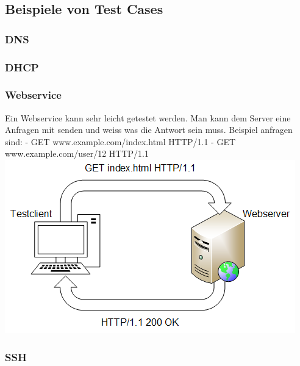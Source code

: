 \documentclass[a4,12pt]{scrartcl}
\begin{document}
\subsection{Beispiele von Test Cases}
\subsubsection{DNS}

\subsubsection{DHCP}

\subsubsection{Webservice}
Ein Webservice kann sehr leicht getestet werden. Man kann dem Server eine Anfragen mit senden und weiss was die Antwort sein muss.
Beispiel anfragen sind: \newline
- GET www.example.com/index.html HTTP/1.1 \newline
- GET www.example.com/user/12 HTTP/1.1 \newline
\newline
\includegraphics[scale=1]{figures/httpget.png}

\subsubsection{SSH}
\end{document}

